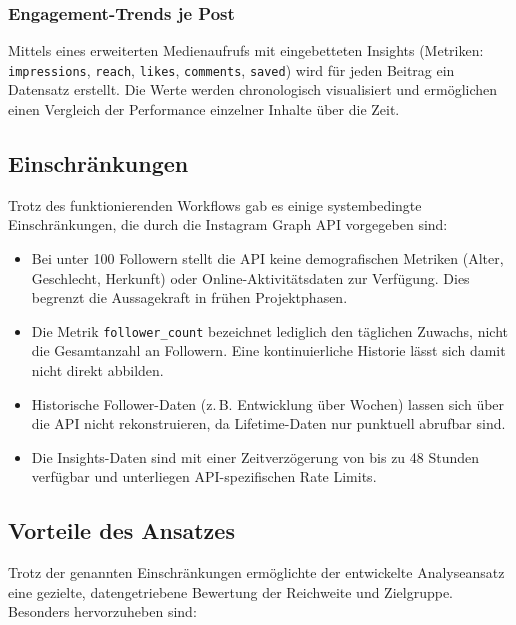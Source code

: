 \documentclass[a4paper,12pt]{article}
\begin{document}
\subsubsection*{Engagement-Trends je Post}

Mittels eines erweiterten Medienaufrufs mit eingebetteten Insights (Metriken: \texttt{impressions}, \texttt{reach}, \texttt{likes}, \texttt{comments}, \texttt{saved}) wird für jeden Beitrag ein Datensatz erstellt. Die Werte werden chronologisch visualisiert und ermöglichen einen Vergleich der Performance einzelner Inhalte über die Zeit.

\subsection{Einschränkungen}

Trotz des funktionierenden Workflows gab es einige systembedingte Einschränkungen, die durch die Instagram Graph API vorgegeben sind:

\begin{itemize}
    \item Bei unter 100 Followern stellt die API keine demografischen Metriken (Alter, Geschlecht, Herkunft) oder Online-Aktivitätsdaten zur Verfügung. Dies begrenzt die Aussagekraft in frühen Projektphasen.
    
    \item Die Metrik \texttt{follower\_count} bezeichnet lediglich den täglichen Zuwachs, nicht die Gesamtanzahl an Followern. Eine kontinuierliche Historie lässt sich damit nicht direkt abbilden.
    
    \item Historische Follower-Daten (z.\,B. Entwicklung über Wochen) lassen sich über die API nicht rekonstruieren, da Lifetime-Daten nur punktuell abrufbar sind.
    
    \item Die Insights-Daten sind mit einer Zeitverzögerung von bis zu 48 Stunden verfügbar und unterliegen API-spezifischen Rate Limits.
\end{itemize}

\subsection{Vorteile des Ansatzes}

Trotz der genannten Einschränkungen ermöglichte der entwickelte Analyseansatz eine gezielte, datengetriebene Bewertung der Reichweite und Zielgruppe. Besonders hervorzuheben sind:
\end{document}

